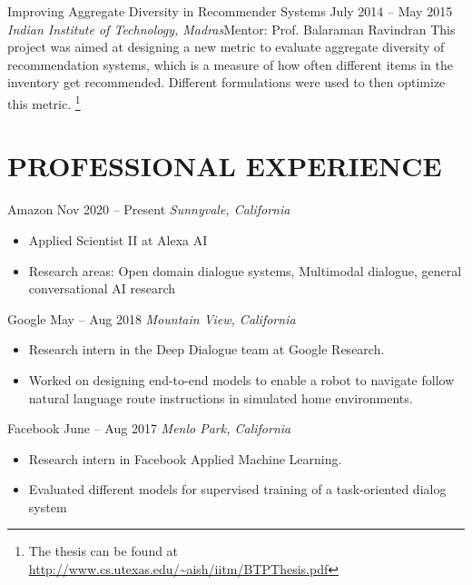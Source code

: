 \documentclass[letterpaper,10pt]{resume}
\begin{document}
{\begin{itemize}
    \credentialtwo
    {{Improving Aggregate Diversity in Recommender Systems}}
    {\sf July 2014 -- May 2015}
    {\it Indian Institute of Technology, Madras}{\textsf{Mentor: Prof. Balaraman Ravindran}}
    {}
    { 
    \small This project was aimed at designing a new metric to evaluate aggregate diversity of recommendation systems, which is a measure of how often different items in the inventory get recommended. Different formulations were used to then optimize this metric. \footnote{The thesis can be found at \url{http://www.cs.utexas.edu/~aish/iitm/BTPThesis.pdf}}
    }
   \vspace{0.2cm}

\end{itemize}

\section{PROFESSIONAL EXPERIENCE}

\begin{itemize}
   \credential
      {Amazon} {Nov 2020 -- Present}
      {\textit{Sunnyvale, California}} {}
      {
		\small \begin{itemize}
			\item{Applied Scientist II at Alexa AI}
			\item{Research areas: Open domain dialogue systems, Multimodal dialogue, general conversational AI research}
		\end{itemize}		      
      }
  \vspace{0.2cm}

   \credential
      {Google} {May -- Aug 2018}
      {\textit{Mountain View, California}} {}
      {
		\small \begin{itemize}
			\item{Research intern in the Deep Dialogue team at Google Research.}
			\item{Worked on designing end-to-end models to enable a robot to navigate follow natural language route instructions in simulated home environments.}
		\end{itemize}		      
      }
  \vspace{0.2cm}
  
   \credential
      {Facebook} {June -- Aug 2017}
      {\textit{Menlo Park, California}} {}
      {
		\small \begin{itemize}
			\item{Research intern in Facebook Applied Machine Learning.}
			\item{Evaluated different models for supervised training of a task-oriented dialog system}
		\end{itemize}		      
      }
  \vspace{0.2cm}



\end{itemize}}
\end{document}

